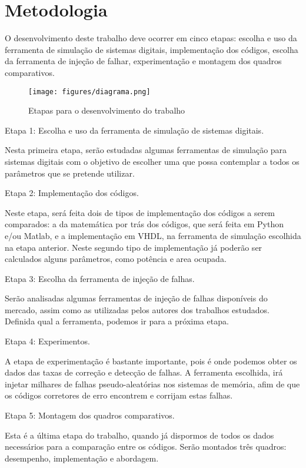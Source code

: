 \chapter{Metodologia}\label{CAP3}

O desenvolvimento deste trabalho deve ocorrer em cinco etapas: escolha e uso da ferramenta de simulação de sistemas digitais, implementação dos códigos, escolha da ferramenta de injeção de falhar, experimentação e montagem dos quadros comparativos.

\begin{figure}[ht]
\centering
\texttt{[image: figures/diagrama.png]}
\caption{Etapas para o desenvolvimento do trabalho}
\label{fig:diagrama}
\end{figure}

Etapa 1: Escolha e uso da ferramenta de simulação de sistemas digitais.

Nesta primeira etapa, serão estudadas algumas ferramentas de simulação para sistemas digitais com o objetivo de escolher uma que possa contemplar a todos os parâmetros que se pretende utilizar.

Etapa 2: Implementação dos códigos.

Neste etapa, será feita dois de tipos de implementação dos códigos a serem comparados: a da matemática por trás dos códigos, que será feita em Python e/ou Matlab, e a implementação em VHDL, na ferramenta de simulação escolhida na etapa anterior. Neste segundo tipo de implementação já poderão ser calculados alguns parâmetros, como potência e area ocupada.

Etapa 3: Escolha da ferramenta de injeção de falhas.

Serão analisadas algumas ferramentas de injeção de falhas disponíveis do mercado, assim como as utilizadas pelos autores dos trabalhos estudados. Definida qual a ferramenta, podemos ir para a próxima etapa.

Etapa 4: Experimentos.

A etapa de experimentação é bastante importante, pois é onde podemos obter os dados das taxas de correção e detecção de falhas. A ferramenta escolhida, irá injetar milhares de falhas pseudo-aleatórias nos sistemas de memória, afim de que os códigos corretores de erro encontrem e corrijam estas falhas.

Etapa 5: Montagem dos quadros comparativos.

Esta é a última etapa do trabalho, quando já dispormos de todos os dados necessários para a comparação entre os códigos. Serão montados três quadros: desempenho, implementação e abordagem.
